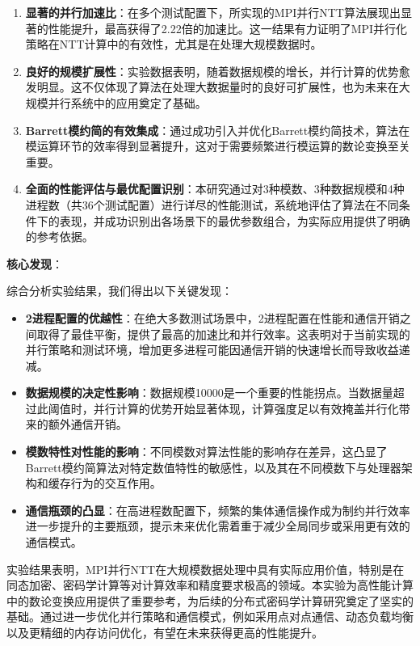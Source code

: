 \documentclass[a4paper]{article}
\begin{document}
\begin{enumerate}
  \item \textbf{显著的并行加速比}：在多个测试配置下，所实现的MPI并行NTT算法展现出显著的性能提升，最高获得了2.22倍的加速比。这一结果有力证明了MPI并行化策略在NTT计算中的有效性，尤其是在处理大规模数据时。
  \item \textbf{良好的规模扩展性}：实验数据表明，随着数据规模的增长，并行计算的优势愈发明显。这不仅体现了算法在处理大数据量时的良好可扩展性，也为未来在大规模并行系统中的应用奠定了基础。
  \item \textbf{Barrett模约简的有效集成}：通过成功引入并优化Barrett模约简技术，算法在模运算环节的效率得到显著提升，这对于需要频繁进行模运算的数论变换至关重要。
  \item \textbf{全面的性能评估与最优配置识别}：本研究通过对3种模数、3种数据规模和4种进程数（共36个测试配置）进行详尽的性能测试，系统地评估了算法在不同条件下的表现，并成功识别出各场景下的最优参数组合，为实际应用提供了明确的参考依据。
\end{enumerate}

\textbf{核心发现}：

综合分析实验结果，我们得出以下关键发现：

\begin{itemize}
  \item \textbf{2进程配置的优越性}：在绝大多数测试场景中，2进程配置在性能和通信开销之间取得了最佳平衡，提供了最高的加速比和并行效率。这表明对于当前实现的并行策略和测试环境，增加更多进程可能因通信开销的快速增长而导致收益递减。
  \item \textbf{数据规模的决定性影响}：数据规模10000是一个重要的性能拐点。当数据量超过此阈值时，并行计算的优势开始显著体现，计算强度足以有效掩盖并行化带来的额外通信开销。
  \item \textbf{模数特性对性能的影响}：不同模数对算法性能的影响存在差异，这凸显了Barrett模约简算法对特定数值特性的敏感性，以及其在不同模数下与处理器架构和缓存行为的交互作用。
  \item \textbf{通信瓶颈的凸显}：在高进程数配置下，频繁的集体通信操作成为制约并行效率进一步提升的主要瓶颈，提示未来优化需着重于减少全局同步或采用更有效的通信模式。
\end{itemize}

\vspace{0.5em}
实验结果表明，MPI并行NTT在大规模数据处理中具有实际应用价值，特别是在同态加密、密码学计算等对计算效率和精度要求极高的领域。本实验为高性能计算中的数论变换应用提供了重要参考，为后续的分布式密码学计算研究奠定了坚实的基础。通过进一步优化并行策略和通信模式，例如采用点对点通信、动态负载均衡以及更精细的内存访问优化，有望在未来获得更高的性能提升。

\newpage

 
\end{document}
